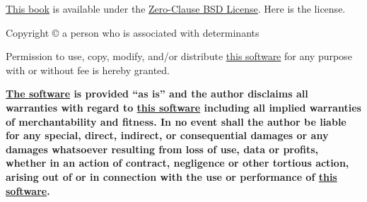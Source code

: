 \vfill

\noindent%
\href{https://gitee.com/septsea/det}{This book}
is available under the
\href{https://opensource.org/license/0bsd}{Zero-Clause BSD License}.
Here is the license.

\vspace{1.5ex}

Copyright © \thedate{}
\pdfmarkupcomment[opacity=0]%
{\protect\theauthor{}}%
{a person who is associated with determinants}

Permission to use, copy, modify, and/or distribute
\href{https://gitee.com/septsea/det}{this software}
for any purpose with or without fee is hereby granted.

\textbf{%
    \href{https://gitee.com/septsea/det}{The software}
    is provided ``as is'' and the author disclaims all warranties with regard to
    \href{https://gitee.com/septsea/det}{this software}
    including all implied warranties of merchantability and fitness. In no event shall the author be liable for any special, direct, indirect, or consequential damages or any damages whatsoever resulting from loss of use, data or profits, whether in an action of contract, negligence or other tortious action, arising out of or in connection with the use or performance of
    \href{https://gitee.com/septsea/det}{this software}.%
}

\endgroup

\clearpage
